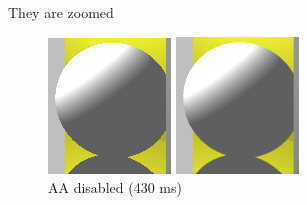They are zoomed
\begin{figure}[H]
    \centering
    \includegraphics[width=\linewidth]{img/antialiasing/no_aa.png}
    \caption{AA disabled (430 ms)}
\endminipage\hfill
{}
    \centering
    \includegraphics[width=\linewidth]{img/antialiasing/super8x.png}

\end{figure}
